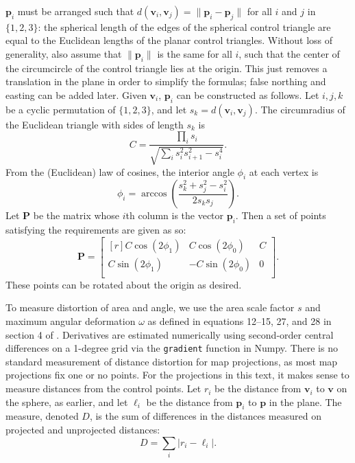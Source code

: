 \documentclass[]{interact}
\begin{document}
$\mathbf p_i$ must be arranged such that
$d\left(\mathbf v_i, \mathbf v_j\right) = \|\mathbf p_i - \mathbf p_j\|$
for all $i$ and $j$ in $\{1, 2, 3\}$: the spherical length of the edges of the
spherical control triangle are equal to the Euclidean lengths of the planar
control triangles. Without loss of generality, also assume that
$\|\mathbf p_i\|$ is the same for all $i$, such that the center of the
circumcircle of the control triangle lies at the origin. This just removes a
translation in the plane in order to simplify the formulas; false northing and
easting can be added later. Given $\mathbf v_i$, $\mathbf p_i$ can be
constructed as follows. Let $i, j, k$ be a cyclic permutation of $\{1, 2, 3\}$,
and let $s_k = d\left(\mathbf v_i, \mathbf v_j\right)$. The circumradius of the Euclidean
triangle with sides of length $s_k$ is
\begin{equation}\label{eq:circumradius}
  C = \frac{\prod_i s_i}{\sqrt{\sum_i s_i^2 s_{i+1}^2 - s_i^4}}.
\end{equation}
From the (Euclidean) law of cosines,
the interior angle $\phi_i$ at each vertex is
\begin{equation}\label{eq:phi}
  \phi_i = \arccos \left( \frac{s_k^2 + s_j^2 - s_i^2}{2 s_k s_j}\right).
\end{equation}
Let $\mathbf P$ be the matrix whose $i$th column is the vector $\mathbf p_i$. Then a
set of points satisfying the requirements are given as so:
\begin{equation}\label{eq:planarctrlpts}
  \mathbf P = \begin{bmatrix*}[r]
  C \cos \left(2 \phi_1 \right) &
  C \cos \left(2 \phi_0 \right) &
  C \\
  C \sin \left(2 \phi_1 \right) &
  -C \sin \left(2 \phi_0 \right) &
  0 \\
\end{bmatrix*}.
\end{equation}
These points can be rotated about the origin as desired.

To measure distortion of area and angle, we use the area scale factor $s$ and
maximum angular deformation $\omega$ as defined in equations 12--15, 27, and 28
in section 4 of \citet{snyder87}. Derivatives are estimated numerically using
second-order central differences on a 1-degree grid via the \texttt{gradient}
function in Numpy.\citep{numpy}
There is no standard measurement of distance distortion for map projections, as
most map projections fix one or no points. For the projections in this text,
it makes sense to measure distances from the control points. Let $r_i$ be the
distance from $\mathbf v_i$ to $\mathbf v$ on the sphere, as earlier, and let
$\ell_i$ be the distance from $\mathbf p_i$ to $\mathbf p$ in the plane.
The measure, denoted $D$, is the sum of differences in the distances
measured on projected and unprojected distances:
\begin{equation}
 D = \sum_i \left| r_i - \ell_i \right|.
\end{equation}
\end{document}
